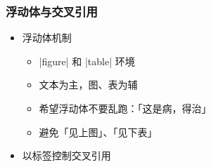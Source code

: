 \begin{frame}[fragile]
\frametitle{浮动体与交叉引用}
\begin{itemize}
  \item<+-> 浮动体机制

    \begin{itemize}
      \item |figure| 和 |table| 环境
      \item 文本为主，图、表为辅
      \item 希望浮动体不要乱跑：「这是病，得治」
      \item 避免「见上图」、「见下表」
    \end{itemize}

  \item<+-> 以标签控制交叉引用

\end{itemize}
\end{frame}

